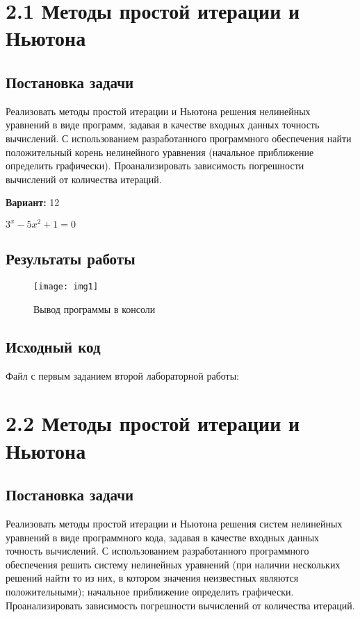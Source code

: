\section* {2.1  Методы простой итерации и Ньютона}

\subsection{Постановка задачи}
Реализовать методы простой итерации и Ньютона решения нелинейных уравнений в виде программ, задавая в качестве входных данных точность вычислений. С использованием разработанного программного обеспечения найти положительный корень нелинейного уравнения (начальное приближение определить графически). Проанализировать зависимость погрешности вычислений от количества итераций.

{\bfseries Вариант:} 12

$3^x-5x^2+1=0$

\subsection{Результаты работы}
\begin{figure}[h!]
\centering
\texttt{[image: img1]}
\caption{Вывод программы в консоли}
\end{figure}
\pagebreak

\subsection{Исходный код}
Файл с первым заданием второй лабораторной работы:

\pagebreak

\section* {2.2  Методы простой итерации и Ньютона}

\subsection{Постановка задачи}
Реализовать методы простой итерации и Ньютона решения систем нелинейных уравнений в виде программного кода, задавая в качестве входных данных точность вычислений. С использованием разработанного программного обеспечения решить систему нелинейных уравнений (при наличии нескольких решений найти то из них, в котором значения неизвестных являются положительными); начальное приближение определить графически. Проанализировать зависимость погрешности вычислений от количества итераций. 

